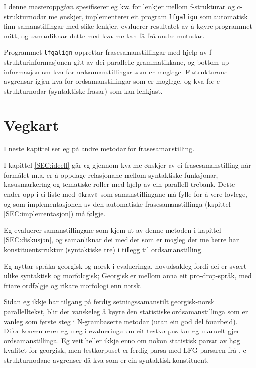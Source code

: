 \documentclass[11pt,a4paper,oneside,draft]{book}
\begin{document}
I denne masteroppgåva spesifiserer eg kva for lenkjer mellom
f-strukturar og c-strukturnodar me ønskjer, implementerer eit program
\texttt{lfgalign} som automatisk finn samanstillingar med slike lenkjer,
evaluerer resultatet av å køyre programmet mitt, og samanliknar dette
med kva me kan få frå andre metodar.

Programmet \texttt{lfgalign} opprettar frasesamanstillingar med hjelp av
f-strukturinformasjonen gitt av dei parallelle grammatikkane, og
bottom-up-informasjon om kva for ordsamanstillingar som er
moglege. F-strukturane avgrensar igjen kva for ordsamanstillingar som
er moglege, og kva for c-strukturnodar (syntaktiske frasar) som kan
lenkjast.


\section{Vegkart}
\label{sec-1.1}

I neste kapittel ser eg på andre metodar for frasesamanstilling.

I kapittel \ref{SEC:ideell} går eg gjennom kva me ønskjer av ei
frasesamanstilling når formålet m.a. er å oppdage relasjonane mellom
syntaktiske funksjonar, kasusmarkering og tematiske roller med hjelp
av ein parallell trebank. Dette ender opp i ei liste med «krav» som
samanstillingane må fylle for å vere lovlege, og som implementasjonen
av den automatiske frasesamanstillinga (kapittel
\ref{SEC:implementasjon}) må følgje.

Eg evaluerer samanstillingane som kjem ut av denne metoden i kapittel
\ref{SEC:diskusjon}, og samanliknar dei med det som er mogleg der me
berre har konstituentstruktur (syntaktiske tre) i tillegg til
ordsamanstilling.

Eg nyttar språka georgisk og norsk i evalueringa, hovudsakleg fordi
dei er svært ulike syntaktisk og morfologisk; Georgisk er mellom anna
eit pro-drop-språk, med friare ordfølgje og rikare morfologi enn
norsk.

Sidan eg ikkje har tilgang på ferdig setningssamanstilt georgisk-norsk
parallelltekst, blir det vanskeleg å køyre den statistiske
ordsamanstillinga som er vanleg som første steg i N-grambaserte
metodar (utan ein god del forarbeid). Difor konsentrerer eg meg i
evalueringa om eit testkorpus kor eg manuelt gjer
ordsamanstillinga. Eg veit heller ikkje enno om nokon statistisk
parsar av høg kvalitet for georgisk, men testkorpuset er ferdig parsa
med LFG-parsaren frå \citet{meurer2008cgg}, c-strukturnodane avgrenser
då kva som er ein syntaktisk konstituent.
\end{document}
